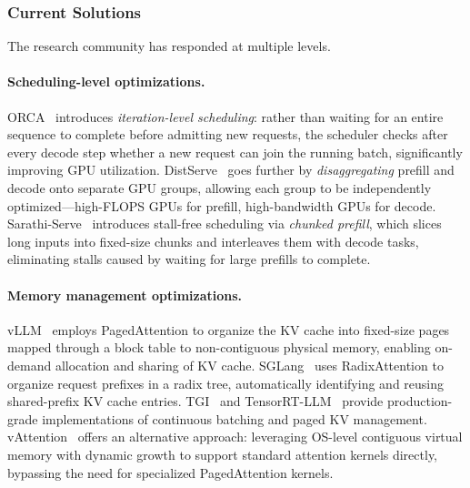 \documentclass[11pt,a4paper]{article}
\begin{document}
\subsubsection{Current Solutions}
The research community has responded at multiple levels.

\paragraph{Scheduling-level optimizations.}
ORCA~\cite{orca2022} introduces \emph{iteration-level scheduling}: rather than waiting for an entire sequence to complete before admitting new requests, the scheduler checks after every decode step whether a new request can join the running batch, significantly improving GPU utilization.
DistServe~\cite{zhong2024distserve} goes further by \emph{disaggregating} prefill and decode onto separate GPU groups, allowing each group to be independently optimized---high-FLOPS GPUs for prefill, high-bandwidth GPUs for decode.
Sarathi-Serve~\cite{agrawal2024sarathi} introduces stall-free scheduling via \emph{chunked prefill}, which slices long inputs into fixed-size chunks and interleaves them with decode tasks, eliminating stalls caused by waiting for large prefills to complete.

\paragraph{Memory management optimizations.}
vLLM~\cite{kwon2023pagedattention,vllm_docs_2026} employs PagedAttention to organize the KV cache into fixed-size pages mapped through a block table to non-contiguous physical memory, enabling on-demand allocation and sharing of KV cache.
SGLang~\cite{sglang2024,sglang_docs_2026} uses RadixAttention to organize request prefixes in a radix tree, automatically identifying and reusing shared-prefix KV cache entries.
TGI~\cite{tgi_docs_2026} and TensorRT-LLM~\cite{tensorrtllm_docs_2026} provide production-grade implementations of continuous batching and paged KV management.
vAttention~\cite{prabhu2024vattention} offers an alternative approach: leveraging OS-level contiguous virtual memory with dynamic growth to support standard attention kernels directly, bypassing the need for specialized PagedAttention kernels.
\end{document}
